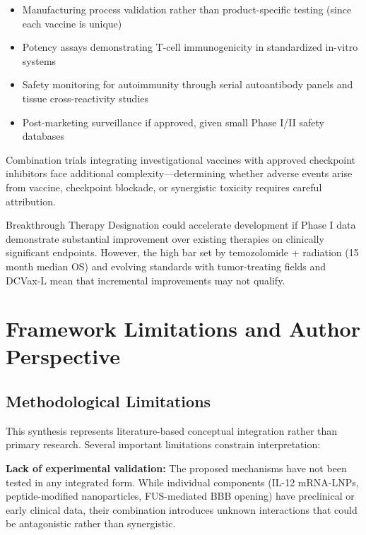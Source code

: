 \documentclass[12pt]{article}
\begin{document}
\begin{itemize}[leftmargin=*,noitemsep]
\item Manufacturing process validation rather than product-specific testing (since each vaccine is unique)
\item Potency assays demonstrating T-cell immunogenicity in standardized in-vitro systems
\item Safety monitoring for autoimmunity through serial autoantibody panels and tissue cross-reactivity studies
\item Post-marketing surveillance if approved, given small Phase I/II safety databases
\end{itemize}

Combination trials integrating investigational vaccines with approved checkpoint inhibitors face additional complexity—determining whether adverse events arise from vaccine, checkpoint blockade, or synergistic toxicity requires careful attribution.

Breakthrough Therapy Designation could accelerate development if Phase I data demonstrate substantial improvement over existing therapies on clinically significant endpoints. However, the high bar set by temozolomide + radiation (15 month median OS) and evolving standards with tumor-treating fields and DCVax-L mean that incremental improvements may not qualify.

\section{Framework Limitations and Author Perspective}

\subsection{Methodological Limitations}
This synthesis represents literature-based conceptual integration rather than primary research. Several important limitations constrain interpretation:

\textbf{Lack of experimental validation:} The proposed mechanisms have not been tested in any integrated form. While individual components (IL-12 mRNA-LNPs, peptide-modified nanoparticles, FUS-mediated BBB opening) have preclinical or early clinical data, their combination introduces unknown interactions that could be antagonistic rather than synergistic.
\end{document}
